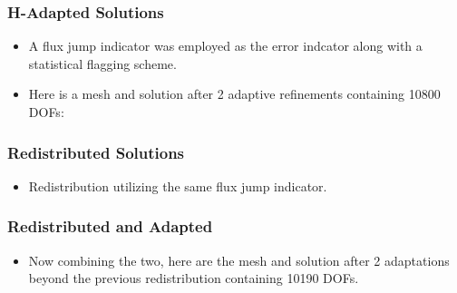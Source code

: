 \frame
{
  \frametitle{H-Adapted Solutions}
  \begin{itemize}[<+->]
    \item A flux jump indicator was employed as the error indcator along with a statistical flagging scheme.
    \item Here is a mesh and solution after 2 adaptive refinements containing 10800 DOFs:
      \begin{figure}[!htb]
        \begin{center}
        \end{center}
      \end{figure}
  \end{itemize}
}

\frame
{
  \frametitle{Redistributed Solutions}
  \begin{itemize}[<+->]
    \item Redistribution utilizing the same flux jump indicator.
      \begin{figure}[!htb]
        \begin{center}
        \end{center}
      \end{figure}
  \end{itemize}
}

\frame
{
  \frametitle{Redistributed and Adapted}
  \begin{itemize}[<+->]
    \item Now combining the two, here are the mesh and solution after 2 adaptations beyond the previous redistribution containing 10190 DOFs.
      \begin{figure}[!htb]
        \begin{center}
        \end{center}
      \end{figure}
  \end{itemize}
}

